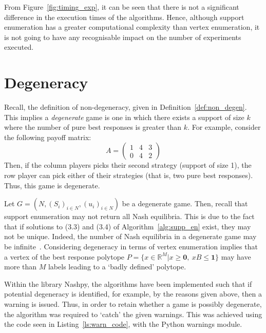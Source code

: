 From Figure~\ref{fig:timing_exp}, it can be seen that there is not a significant
difference in the execution times of the algorithms. Hence, although support
enumeration has a greater computational complexity than vertex enumeration, it
is not going to have any recognisable impact on the number of experiments
executed.


\section{Degeneracy}\label{sec:Degeneracy}
Recall, the definition of non-degeneracy, given in
Definition~\ref{def:non_degen}. This implies a \textit{degenerate} game is one in
which there exists a support of size \(k\) where the number of pure best
responses is greater than \(k\). For example, consider the following payoff
matrix:
\begin{equation}
    A = \begin{pmatrix}
        1 & 4 & 3\\
        0 & 4 & 2
    \end{pmatrix}
\end{equation}
Then, if the column players picks their second strategy (support of size 1),
the row player can pick either of their strategies (that is, two pure best
responses). Thus, this game is degenerate.

Let \(G = (N, {(S_{i})}_{i \in N}, {(u_{i})}_{i \in N})\) be a degenerate game.
Then, recall that support enumeration may not return all Nash equilibria. This
is due to the fact that if solutions to (3.3) and (3.4) of Algorithm~\ref{alg:supp_en} exist, they may not be unique. Indeed, the number of
Nash equilibria in a degenerate game may be infinite~\cite{NoamNisan2007}.
Considering degeneracy in terms of vertex enumeration implies that a vertex of
the best response polytope \(P = \{x \in \mathbb{R}^{M} | x \ge \textbf{0}, ~ xB
\le \textbf{1}\} \) may have more than \(M\) labels leading to a `badly defined'
polytope.

Within the library Nashpy, the algorithms have been implemented such that if
potential degeneracy is identified, for example, by the reasons given above, then
a warning is issued. Thus, in order to retain whether a game is possibly
degenerate, the algorithm was required to `catch' the given warnings. This
was achieved using the code seen in Listing~\ref{ls:warn_code}, with the Python
warnings module.

